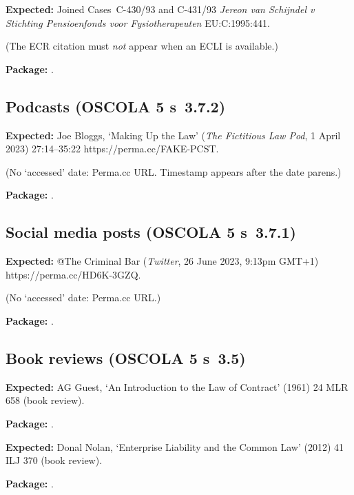 \documentclass[12pt]{article}
\newcommand{\expected}[1]{\par\textbf{Expected:} #1}
\newcommand{\pkg}{\par\textbf{Package:} }
\begin{document}
\expected{%
  Joined Cases~C-430/93 and C-431/93 \emph{Jereon van Schijndel v Stichting Pensioenfonds voor Fysiotherapeuten}
  EU:C:1995:441.%
}

(The ECR citation must \emph{not} appear when an ECLI is available.)

\pkg
\cite{C430/93}.

\subsection{Podcasts (OSCOLA 5 s~3.7.2)}

\expected{%
  Joe Bloggs, `Making Up the Law'
  (\emph{The Fictitious Law Pod}, 1 April 2023) 27:14--35:22
  \textlangle{}https://perma.cc/FAKE-PCST\textrangle.%
}

(No `accessed' date: Perma.cc URL. Timestamp appears after the date parens.)

\pkg
\cite[27:14--35:22]{bloggs:podcast23}.

\subsection{Social media posts (OSCOLA 5 s~3.7.1)}

\expected{%
  @The Criminal Bar (\emph{Twitter}, 26 June 2023, 9:13pm GMT+1)
  \textlangle{}https://perma.cc/HD6K-3GZQ\textrangle.%
}

(No `accessed' date: Perma.cc URL.)

\pkg
\cite{criminalbar:tweet23}.

\subsection{Book reviews (OSCOLA 5 s~3.5)}

\expected{%
  AG Guest, `An Introduction to the Law of Contract'
  (1961) 24 MLR 658 (book review).%
}

\pkg
\cite{guest:1961}.

\expected{%
  Donal Nolan, `Enterprise Liability and the Common Law'
  (2012) 41 ILJ 370 (book review).%
}

\pkg
\cite{nolan:2012}.
\end{document}
